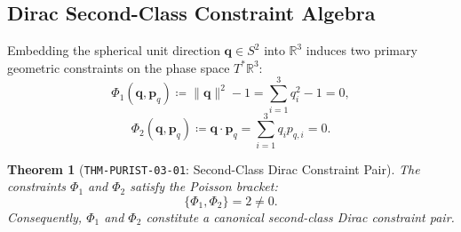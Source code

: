 \documentclass[11pt,a4paper,reqno]{article}
\theoremstyle{plain}
\newtheorem{theorem}{Theorem}[section]
\theoremstyle{definition}
\theoremstyle{remark}
\numberwithin{equation}{section}
\newcommand{\R}{\mathbb{R}}
\begin{document}
\subsection{Dirac Second-Class Constraint Algebra}
Embedding the spherical unit direction $\bm{q} \in S^2$ into $\R^3$ induces two primary geometric constraints on the phase space $T^*\R^3$:
\begin{equation}
  \Phi_1(\bm{q}, \bm{p}_q) \coloneqq \|\bm{q}\|^2 - 1 = \sum_{i=1}^3 q_i^2 - 1 = 0,
\end{equation}
\begin{equation}
  \Phi_2(\bm{q}, \bm{p}_q) \coloneqq \bm{q} \cdot \bm{p}_q = \sum_{i=1}^3 q_i p_{q,i} = 0.
\end{equation}

\begin{theorem}[\texttt{THM-PURIST-03-01}: Second-Class Dirac Constraint Pair]
\label{thm:dirac_pair}
The constraints $\Phi_1$ and $\Phi_2$ satisfy the Poisson bracket:
\begin{equation}
  \{\Phi_1, \Phi_2\} = 2 \ne 0.
  \label{eq:dirac_bracket_val}
\end{equation}
Consequently, $\Phi_1$ and $\Phi_2$ constitute a canonical second-class Dirac constraint pair.
\end{theorem}
\end{document}
